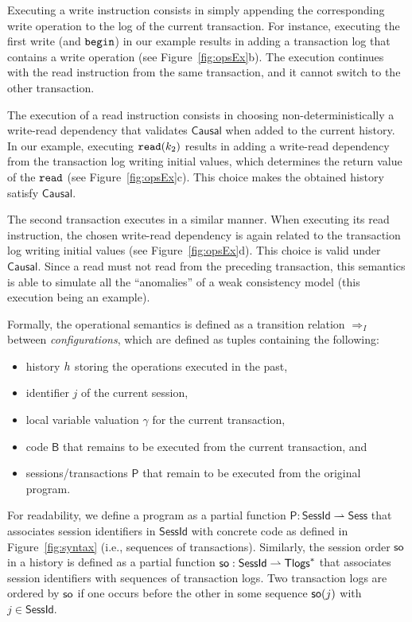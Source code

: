 Executing a write instruction consists in simply appending the corresponding write operation to the log of the current transaction. For instance, executing the first write (and $\mathtt{begin}$) in our example results in adding a transaction log that contains a write operation (see Figure~\ref{fig:opsEx}b). The execution continues with the read instruction from the same transaction, and it cannot switch to the other transaction.

The execution of a read instruction consists in choosing non-deterministically a write-read dependency that validates $\mathsf{Causal}$ when added to the current history. In our example, executing $\mathtt{read}(k_2)$ results in adding a write-read dependency from the transaction log writing initial values, which determines the return value of the $\mathtt{read}$ (see Figure~\ref{fig:opsEx}c). This choice makes the obtained history satisfy $\mathsf{Causal}$. 

The second transaction executes in a similar manner. When executing its read instruction, the chosen write-read dependency is again related to the transaction log writing initial values (see Figure~\ref{fig:opsEx}d). This choice is valid under $\mathsf{Causal}$. Since a read must not read from the preceding transaction, this semantics is able to simulate all the ``anomalies'' of a weak consistency model (this execution being an example).

Formally, the operational semantics is defined as a transition relation $\Rightarrow_I$ between \emph{configurations}, which are defined as tuples containing the following:
\begin{itemize}
	\item history ${h}$ storing the operations executed in the past, 
	\item identifier $j$ of the current session,
	\item local variable valuation $\gamma$ for the current transaction, 
	\item code $\mathsf{B}$ that remains to be executed from the current transaction, and
	\item sessions/transactions $\mathsf{P}$ that remain to be executed from the original program.
\end{itemize}

For readability, we define a program as a partial function $\mathsf{P}:\mathsf{SessId}\rightharpoonup \mathsf{Sess}$ that associates session identifiers in $\mathsf{SessId}$ with concrete code as defined in Figure~\ref{fig:syntax} (i.e., sequences of transactions). Similarly, the session order $\mathsf{so}$ in a history is defined as a partial function $\mathsf{so}:\mathsf{SessId}\rightharpoonup \mathsf{Tlogs}^*$ that associates session identifiers with sequences of transaction logs. Two transaction logs are ordered by $\mathsf{so}$ if one occurs before the other in some sequence $\mathsf{so}(j)$ with 
$j\in \mathsf{SessId}$.


